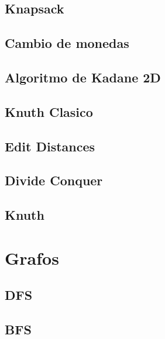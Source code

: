 \subsection{Knapsack}
\raggedbottom
\hrulefill
\subsection{Cambio de monedas}
\raggedbottom
\hrulefill
\subsection{Algoritmo de Kadane 2D}
\raggedbottom
\hrulefill
\subsection{Knuth Clasico}
\raggedbottom
\hrulefill
\subsection{Edit Distances}
\raggedbottom
\hrulefill
\subsection{Divide Conquer}
\raggedbottom
\hrulefill
\subsection{Knuth}
\raggedbottom
\hrulefill

\section{Grafos}
\subsection{DFS}
\raggedbottom
\hrulefill
\subsection{BFS}
\raggedbottom
\hrulefill
